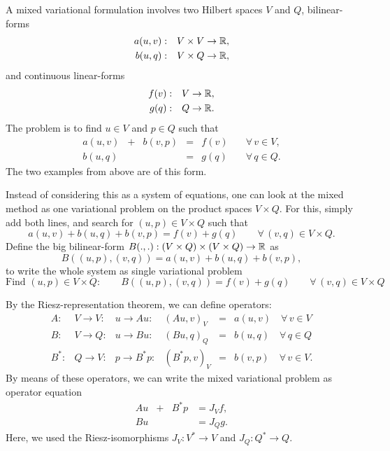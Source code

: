 A mixed variational formulation involves two Hilbert spaces $V$ and $Q$,
bilinear-forms
\begin{eqnarray*}
a(u,v) & : & V \times V  \rightarrow {\mathbb R}, \\
b(u,q) & : & V \times Q  \rightarrow {\mathbb R},
\end{eqnarray*}
and continuous linear-forms
\begin{eqnarray*}
f(v) & : & V \rightarrow {\mathbb R}, \\
g(q) & : & Q \rightarrow {\mathbb R}.
\end{eqnarray*}
%
The problem is to find $u \in V$ and $p \in Q$ such that
\begin{equation}
\begin{array}{ccccll}
a(u,v) & + & b(v,p) & = & f(v) \quad & \forall \, v \in V, \\[0.2em]
b(u,q) & & & = & g(q) \quad & \forall \, q \in Q.
\end{array}
\end{equation}
%
The two examples from above are of this form.


\bigskip

Instead of considering this as a system of equations, one can look at
the mixed method as one variational problem on the product spaces $V \times Q$.
For this, simply add both lines, and search for $(u,p) \in V \times Q$ such that
$$
a(u,v) + b(u,q) + b(v,p) = f(v) + g(q) \qquad \forall \, (v,q) \in V \times Q.
$$
Define the big bilinear-form $B(.,.) : (V \times Q) \times (V \times Q) \rightarrow {\mathbb R}$ as
$$
B( (u,p), (v,q) ) = a(u,v) + b(u,q) + b(v,p),
$$
to write the whole system as single variational problem
$$
\mbox{Find } (u,p) \in V \times Q : \qquad
B((u,p),(v,q)) = f(v) + g(q) \qquad \forall \, (v,q) \in V \times Q
$$

\bigskip

By the Riesz-representation theorem, we can define operators:
$$
\begin{array}{lllrcl}
A : & V \rightarrow V : & u \rightarrow A u : & (Au,v)_V & = & a(u,v) \quad \forall \, v \in V \\
B : & V \rightarrow Q : & u \rightarrow B u : & (Bu,q)_Q & = & b(u,q) \quad \forall \, q \in Q \\
B^* : & Q \rightarrow V : & p \rightarrow B^* p : & (B^*p,v)_V & = & b(v,p) \quad \forall \, v \in V.
\end{array}
$$
By means of these operators, we can write the mixed variational problem as
operator equation
\begin{equation}
\begin{array}{ccccl}
A u & + & B^* p & = J_V f, \\
B u & & & = J_Q g.
\end{array}
\end{equation}
Here, we used the Riesz-isomorphisms $J_V : V^\ast \rightarrow V$ and $J_Q : Q^\ast \rightarrow Q$. 

